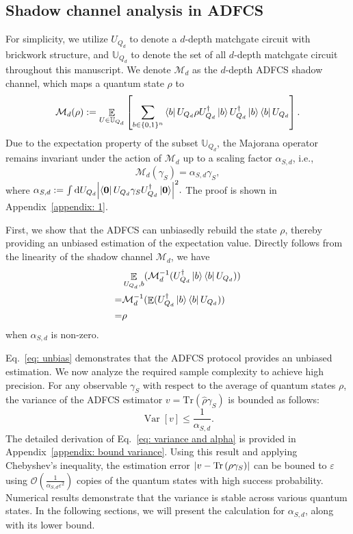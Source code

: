 \documentclass[showpacs,twocolumn,aps,prx,long bibliography,superscriptaddress,notitlepage]{revtex4-1}
\newcommand{\cbra}[1]{\{ #1 \}}
\newcommand{\tra}[1]{\text{Tr}\left( #1 \right)}
\newcommand{\mean}{\mathop{\mathbb{E}}}
\newcommand{\Var}{\mathop{\mathrm{Var}}}
\newcommand{\Mcal}{\mathcal{M}}
\newcommand{\Ubb}{\mathbb{U}}
\begin{document}
\subsection{Shadow channel analysis in ADFCS}
\label{sec: shadow channel}
For simplicity, we utilize $U_{Q_d}$ to denote a $d$-depth matchgate circuit with brickwork structure, and $\Ubb_{Q_d}$ to denote the set of all $d$-depth matchgate circuit throughout this manuscript. We denote $\Mcal_d$ as the $d$-depth ADFCS shadow channel, which maps a quantum state $\rho$ to
\begin{equation}
    \mathcal{M}_d(\rho) := \mathop{\mathbb{E}}\limits_{U\in\Ubb_{Q_d}} \left[\sum_{b\in\cbra{0,1}^n} \bra{b}U_{Q_d} 
  \rho U_{Q_d}^\dagger \ket{b}  U_{Q_d}^\dagger \ket{b} \bra{b}U_{Q_d}\right].
\end{equation}
Due to the expectation property of the subset $\Ubb_{Q_d}$, the Majorana operator remains invariant under the action of $\Mcal_{d}$ up to a scaling factor $\alpha_{S,d}$, i.e.,
\begin{equation}
\mathcal{M}_d(\gamma_S) = \alpha_{S,d} \gamma_S,
\label{eq: lemma1 eigen}
\end{equation}
where
$\alpha_{S,d} := \int \dd U_{Q_d} \abs{\bra{\bm 0}U_{Q_d} \gamma_S U_{Q_d}^\dagger\ket{\bm 0}}^2.$
The proof is shown in Appendix~\ref{appendix: 1}. 


First, we show that the ADFCS can unbiasedly rebuild the state $\rho$, thereby providing an unbiased estimation of the expectation value. Directly follows from the linearity of the shadow channel $\mathcal{M}_d$, we have
\begin{align}
    &\mathop{\mathbb{E}}\limits_{U_{Q_d}, b } ( \mathcal{M}^{-1}_{d}(U_{Q_d}^\dagger \ket{b} \bra{b}U_{Q_d})) \\
    = &\mathcal{M}^{-1}_{d}(\mean(U_{Q_d}^\dagger \ket{b} \bra{b}U_{Q_d}) )\\
    =& \rho
    \label{eq: unbias}
\end{align}
when $\alpha_{S,d}$ is non-zero. 




Eq.~\eqref{eq: unbias} demonstrates that the ADFCS protocol provides an unbiased estimation. We now analyze the required sample complexity to achieve high precision.  
For any observable $\gamma_S$ with respect to the average of quantum states $\rho$, the variance of the ADFCS estimator $v = \tra{\hat{\rho} \gamma_S}$ is bounded as follows:
\begin{equation}
\Var[v] \leq \frac{1}{\alpha_{S,d}}.
\label{eq: variance and alpha}
\end{equation}
The detailed derivation of Eq.~\eqref{eq: variance and alpha} is provided in Appendix~\ref{appendix: bound variance}. Using this result and applying Chebyshev's inequality, the estimation error $\abs{v - \tra{\rho \gamma_S}}$ can be bouned to $\varepsilon$ using $\mathcal{O}(\frac{1}{\alpha_{S,d}\varepsilon^2})$ copies of the quantum states with high success probability. Numerical results demonstrate that the variance is stable across various quantum states. In the following sections, we will present the calculation for $\alpha_{S,d}$, along with its {lower bound.}  
\end{document}
